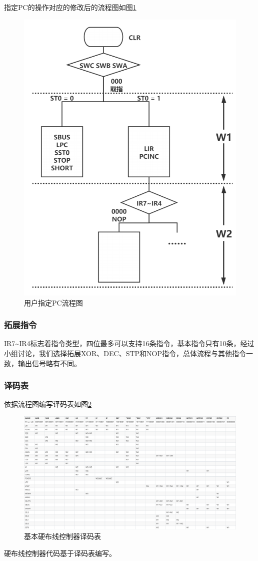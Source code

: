 指定PC的操作对应的修改后的流程图如图\ref{fig:pc_modifier}
\begin{figure}[htbp]
    \centering
    \includegraphics[width=0.7\linewidth]{figures/chapter2/PC_modifier.png}
    \caption{用户指定PC流程图}
    \label{fig:pc_modifier}
\end{figure}

\subsubsection{拓展指令}
IR7\~{}IR4标志着指令类型，四位最多可以支持16条指令，基本指令只有10条，经过小组讨论，我们选择拓展XOR、DEC、STP和NOP指令，总体流程与其他指令一致，输出信号略有不同。

\subsubsection{译码表}
依据流程图编写译码表如图\ref{fig:decoding_table}

\begin{figure}[htbp]
    \centering
    \includegraphics[width=0.9\linewidth]{figures/chapter2/decoding_table.png}
    \caption{基本硬布线控制器译码表}
    \label{fig:decoding_table}
\end{figure}

硬布线控制器代码基于译码表编写。
\clearpage
